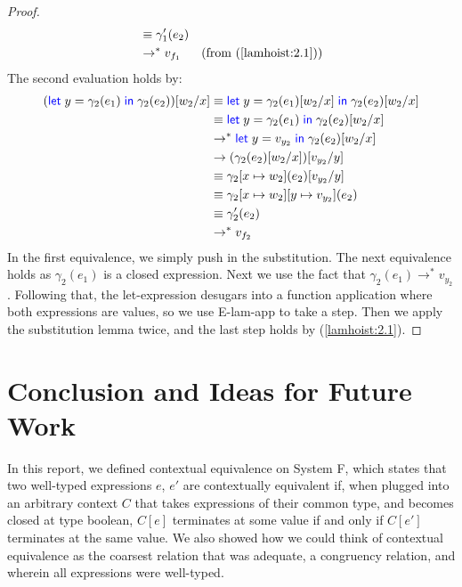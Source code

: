\documentclass[a4paper, 11pt]{report}
\theoremstyle{definition}
\newcommand{\var}{x}
\newcommand{\varB}{y}
\newcommand{\expr}{e}
\newcommand{\val}{v}
\newcommand{\valB}{w}
\newcommand{\subst}[3]{#1{\left[#3 \middle/ #2 \right]}}
\newcommand{\ctx}{C}
\newcommand{\step}{\rightarrow}
\newcommand{\stepS}{\rightarrow^*}
\newcommand{\map}[2]{#1 \mapsto #2}
\begin{document}
\begin{proof}
\begin{align*}
    &\equiv \gamma'_1(\expr_2)\\
    &\stepS \val_{f_1} &\text{(from (\ref{lamhoist:2.1}))}
  \end{align*}
  The second evaluation holds by:
  \begin{align*}
    \subst{(\Let \varB = \gamma_2(\expr_1) in \gamma_2(\expr_2))}{\var}{\valB_2}
    &\equiv
    \Let \varB = \subst{\gamma_2(\expr_1)}{\var}{\valB_2} in \subst{\gamma_2(\expr_2)}{\var}{\valB_2}\\
    &\equiv
    \Let \varB = \gamma_2(\expr_1) in \subst{\gamma_2(\expr_2)}{\var}{\valB_2}\\
    &\stepS
    \Let \varB = \val_{y_2} in \subst{\gamma_2(\expr_2)}{\var}{\valB_2}\\
    &\step
    \subst{(\subst{\gamma_2(\expr_2)}{\var}{\valB_2})}{\varB}{\val_{y_2}}\\
    &\equiv
    \subst{\gamma_2[\map{\var}{\valB_2}](\expr_2)}{\varB}{\val_{y_2}}\\
    &\equiv
    \gamma_2[\map{\var}{\valB_2}][\map{\varB}{\val_{y_2}}](\expr_2)\\
    &\equiv
    \gamma'_2(\expr_2)\\
    &\stepS \val_{f_2}
  \end{align*}
  In the first equivalence, we simply push in the substitution. The next equivalence holds as $\gamma_2(\expr_1)$ is a closed expression. Next we use the fact that $\gamma_2(\expr_1) \stepS \val_{y_2}$. Following that, the let-expression desugars into a function application where both expressions are values, so we use E-lam-app to take a step. Then we apply the substitution lemma twice, and the last step holds by (\ref{lamhoist:2.1}).
\end{proof}


\chapter{Conclusion and Ideas for Future Work}
\label{ch:conclusion}

In this report, we defined contextual equivalence on System F, which states that two well-typed expressions $\expr$, $\expr'$ are contextually equivalent if, when plugged into an arbitrary context $\ctx$ that takes expressions of their common type, and becomes closed at type boolean, $\ctx[\expr]$ terminates at some value if and only if $\ctx[\expr']$ terminates at the same value. We also showed how we could think of contextual equivalence as the coarsest relation that was adequate, a congruency relation, and wherein all expressions were well-typed.
\end{document}
